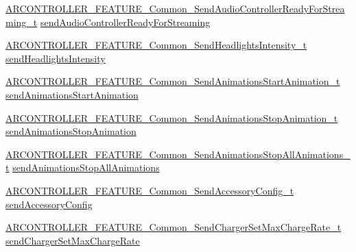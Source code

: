 \begin{DoxyCompactItemize}
\item 
\hyperlink{_a_r_c_o_n_t_r_o_l_l_e_r___feature_8h_ac92d55786960c88a58cd923b1d3c2804}{A\+R\+C\+O\+N\+T\+R\+O\+L\+L\+E\+R\+\_\+\+F\+E\+A\+T\+U\+R\+E\+\_\+\+Common\+\_\+\+Send\+Audio\+Controller\+Ready\+For\+Streaming\+\_\+t} \hyperlink{struct_a_r_c_o_n_t_r_o_l_l_e_r___f_e_a_t_u_r_e___common__t_a42945fce2951942afb5e76d326bc6431}{send\+Audio\+Controller\+Ready\+For\+Streaming}
\item 
\hyperlink{_a_r_c_o_n_t_r_o_l_l_e_r___feature_8h_a3407c02f10a730c48c140e42c40fcd5b}{A\+R\+C\+O\+N\+T\+R\+O\+L\+L\+E\+R\+\_\+\+F\+E\+A\+T\+U\+R\+E\+\_\+\+Common\+\_\+\+Send\+Headlights\+Intensity\+\_\+t} \hyperlink{struct_a_r_c_o_n_t_r_o_l_l_e_r___f_e_a_t_u_r_e___common__t_a28cc3ae716b6ada94e29057a2ca6ee2e}{send\+Headlights\+Intensity}
\item 
\hyperlink{_a_r_c_o_n_t_r_o_l_l_e_r___feature_8h_a0ffd44e8b01c60dea1249061aabfc0cf}{A\+R\+C\+O\+N\+T\+R\+O\+L\+L\+E\+R\+\_\+\+F\+E\+A\+T\+U\+R\+E\+\_\+\+Common\+\_\+\+Send\+Animations\+Start\+Animation\+\_\+t} \hyperlink{struct_a_r_c_o_n_t_r_o_l_l_e_r___f_e_a_t_u_r_e___common__t_aa1e8962c3a21b17fe0d11ef65afe1567}{send\+Animations\+Start\+Animation}
\item 
\hyperlink{_a_r_c_o_n_t_r_o_l_l_e_r___feature_8h_ae2d7d12cc6db15e42ea1ab2564da6298}{A\+R\+C\+O\+N\+T\+R\+O\+L\+L\+E\+R\+\_\+\+F\+E\+A\+T\+U\+R\+E\+\_\+\+Common\+\_\+\+Send\+Animations\+Stop\+Animation\+\_\+t} \hyperlink{struct_a_r_c_o_n_t_r_o_l_l_e_r___f_e_a_t_u_r_e___common__t_a0158c624dc994aed2157f1c44ad4481f}{send\+Animations\+Stop\+Animation}
\item 
\hyperlink{_a_r_c_o_n_t_r_o_l_l_e_r___feature_8h_ad3f6d453dbe426b363a118c46761abf7}{A\+R\+C\+O\+N\+T\+R\+O\+L\+L\+E\+R\+\_\+\+F\+E\+A\+T\+U\+R\+E\+\_\+\+Common\+\_\+\+Send\+Animations\+Stop\+All\+Animations\+\_\+t} \hyperlink{struct_a_r_c_o_n_t_r_o_l_l_e_r___f_e_a_t_u_r_e___common__t_ad835700d2edf3034657b24d2ed431dcd}{send\+Animations\+Stop\+All\+Animations}
\item 
\hyperlink{_a_r_c_o_n_t_r_o_l_l_e_r___feature_8h_a3ee2e0ac0ad188c448566ad55351296f}{A\+R\+C\+O\+N\+T\+R\+O\+L\+L\+E\+R\+\_\+\+F\+E\+A\+T\+U\+R\+E\+\_\+\+Common\+\_\+\+Send\+Accessory\+Config\+\_\+t} \hyperlink{struct_a_r_c_o_n_t_r_o_l_l_e_r___f_e_a_t_u_r_e___common__t_a200fee1dd84261f9364810e4a58ea7d8}{send\+Accessory\+Config}
\item 
\hyperlink{_a_r_c_o_n_t_r_o_l_l_e_r___feature_8h_ac0d4a3c1b5a4a4246ff9728e06280218}{A\+R\+C\+O\+N\+T\+R\+O\+L\+L\+E\+R\+\_\+\+F\+E\+A\+T\+U\+R\+E\+\_\+\+Common\+\_\+\+Send\+Charger\+Set\+Max\+Charge\+Rate\+\_\+t} \hyperlink{struct_a_r_c_o_n_t_r_o_l_l_e_r___f_e_a_t_u_r_e___common__t_a46ebe1e31e293b14c895353df295ae30}{send\+Charger\+Set\+Max\+Charge\+Rate}

\end{DoxyCompactItemize}
